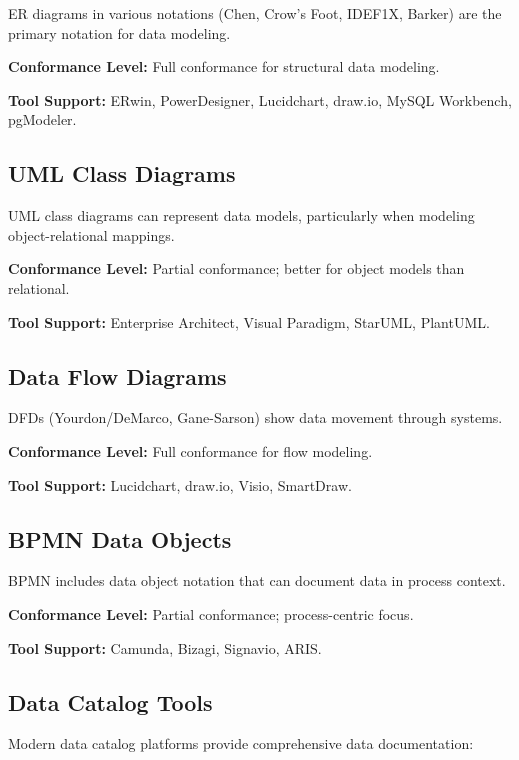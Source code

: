 \documentclass[11pt,letterpaper]{article}
\begin{document}
ER diagrams in various notations (Chen, Crow's Foot, IDEF1X, Barker) are the primary notation for data modeling.

\textbf{Conformance Level:} Full conformance for structural data modeling.

\textbf{Tool Support:} ERwin, PowerDesigner, Lucidchart, draw.io, MySQL Workbench, pgModeler.

\subsection{UML Class Diagrams}

UML class diagrams can represent data models, particularly when modeling object-relational mappings.

\textbf{Conformance Level:} Partial conformance; better for object models than relational.

\textbf{Tool Support:} Enterprise Architect, Visual Paradigm, StarUML, PlantUML.

\subsection{Data Flow Diagrams}

DFDs (Yourdon/DeMarco, Gane-Sarson) show data movement through systems.

\textbf{Conformance Level:} Full conformance for flow modeling.

\textbf{Tool Support:} Lucidchart, draw.io, Visio, SmartDraw.

\subsection{BPMN Data Objects}

BPMN includes data object notation that can document data in process context.

\textbf{Conformance Level:} Partial conformance; process-centric focus.

\textbf{Tool Support:} Camunda, Bizagi, Signavio, ARIS.

\subsection{Data Catalog Tools}

Modern data catalog platforms provide comprehensive data documentation:
\end{document}
